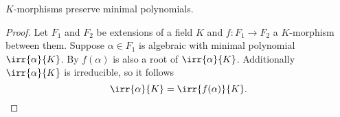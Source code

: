\documentclass[12pt,oneside]{book}
\begin{document}
\begin{corollary}
	\( K \)-morphisms preserve minimal polynomials.
\end{corollary}
\begin{proof}
	Let \( F_1 \) and \( F_2 \) be extensions of a field \( K \) and \( f \colon F_1 \to F_2
	\) a \( K \)-morphism between them. Suppose \( \alpha \in F_1 \) is algebraic with
	minimal polynomial \( \irr{\alpha}{K} \). By 
	\( f(\alpha) \) is also a root of \( \irr{\alpha}{K} \). Additionally \( \irr{\alpha}{K}
	\) is irreducible, so it follows
	\begin{equation*}
		\irr{\alpha}{K} = \irr{f(\alpha)}{K}.	
	\end{equation*}
\end{proof}

\parbreak
\end{document}
